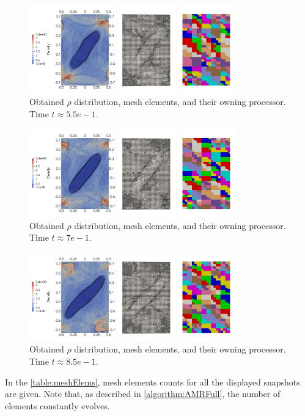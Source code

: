 \begin{figure}[H]
	\begin{center}
		\includegraphics[width=0.8\textwidth]{img/mhd-blast/new/adapt-full10.jpg}
	\caption{Obtained $\rho$ distribution, mesh elements, and their owning processor. Time $t\approx 5.5e-1$.}
	\label{figure:amrBlast6}
	\end{center}
\end{figure}
\vspace{-4mm}


\begin{figure}[H]
	\begin{center}
		\includegraphics[width=0.8\textwidth]{img/mhd-blast/new/adapt-full13.jpg}
	\caption{Obtained $\rho$ distribution, mesh elements, and their owning processor. Time $t\approx 7e-1$.}
	\label{figure:amrBlast7}
	\end{center}
\end{figure}
\vspace{-4mm}


\begin{figure}[H]
	\begin{center}
		\includegraphics[width=0.8\textwidth]{img/mhd-blast/new/adapt-full16.jpg}
	\caption{Obtained $\rho$ distribution, mesh elements, and their owning processor. Time $t\approx 8.5e-1$.}
	\label{figure:amrBlast8}
	\end{center}
\end{figure}
\vspace{-4mm}
In the \cref{table:meshElems}, mesh elements counts for all the displayed snapshots are given. Note that, as described in \cref{algorithm:AMRFull}, the number of elements constantly evolves.

